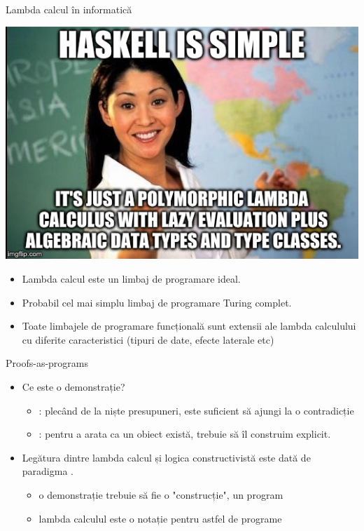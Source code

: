 \documentclass[xcolor=pdftex,romanian,colorlinks]{beamer}
\begin{document}
\begin{frame}{Lambda calcul în informatică}

\begin{center}
\includegraphics[scale=.35]{images/haskell.jpeg}
\end{center}

\begin{itemize}
	\item Lambda calcul este un limbaj de programare ideal.
	\medskip
	\item Probabil cel mai simplu limbaj de programare Turing complet.
	\medskip
	\item Toate \alert{limbajele de programare funcțională} sunt extensii ale lambda calculului cu diferite caracteristici (tipuri de date, efecte laterale etc)
\end{itemize}
\end{frame}

\begin{frame}{Proofs-as-programs}

\begin{itemize}
	\item \alert{Ce este o demonstrație}?
	\begin{itemize}
		\item {}: plecând de la niște presupuneri, este suficient să ajungi la o contradicție
		\item {}: pentru a arata ca un obiect există, trebuie să îl construim explicit.
	\end{itemize}
	\medskip 
	\item Legătura dintre lambda calcul și logica constructivistă este dată de paradigma \textit{}.
	\begin{itemize}
		\item o demonstrație trebuie să fie o "construcție", un program
		\item lambda calculul este o notație pentru astfel de programe
	\end{itemize}
\end{itemize}

\end{frame}
\end{document}
